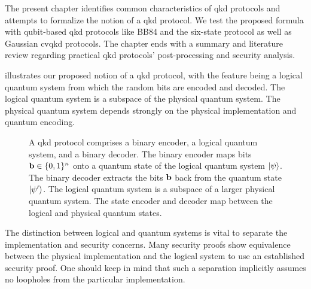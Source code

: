 The present chapter identifies common characteristics of \gls{qkd} protocols and attempts to formalize the notion of a \gls{qkd} protocol.
We test the proposed formula with qubit-based \gls{qkd} protocols like BB84 and the six-state protocol as well as Gaussian \gls{cvqkd} protocols.
The chapter ends with a summary and literature review regarding practical \gls{qkd} protocols' post-processing and security analysis.

 illustrates our proposed notion of a \gls{qkd} protocol, with the feature being a logical quantum system from which the random bits are encoded and decoded.
The logical quantum system is a subspace of the physical quantum system.
The physical quantum system depends strongly on the physical implementation and quantum encoding.
\begin{figure}[htb]
	\centering
	
	\caption{A \gls{qkd} protocol comprises a binary encoder, a logical quantum system, and a binary decoder. The binary encoder maps bits $\vb{b}\in\{0,1\}^n$ onto a quantum state of the logical quantum system $\ket{\psi}$. The binary decoder extracts the bits $\vb{b}$ back from the quantum state $\ket{\psi^\prime}$. The logical quantum system is a subspace of a larger physical quantum system. The state encoder and decoder map between the logical and physical quantum states.}\label{fig:qkd_protocol}
\end{figure}
The distinction between logical and quantum systems is vital to separate the implementation and security concerns.
Many security proofs show equivalence between the physical implementation and the logical system to use an established security proof.
One should keep in mind that such a separation implicitly assumes no loopholes from the particular implementation.


